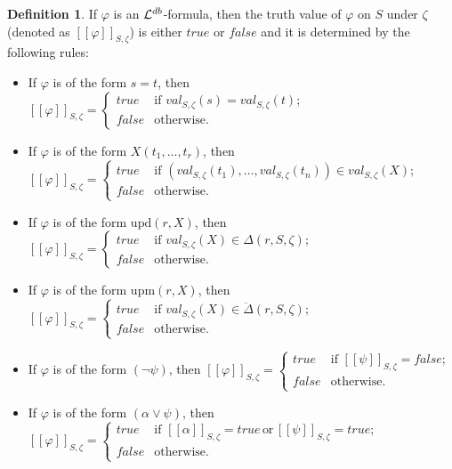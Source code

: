 \documentclass[preprint,11pt]{elsarticle}
\theoremstyle{definition}
\newtheorem{definition}{Definition}[section]
\theoremstyle{remark}
\begin{document}
\begin{definition}
If $\varphi$ is an ${\cal L}^{db}$-formula, then the truth value of $\varphi$ on $S$ under $\zeta$ (denoted as $[\![\varphi]\!]_{S,\zeta}$) is either $\mathit{true}$ or $\mathit{false}$ and it is determined by the following rules:
\begin{itemize}
\item If $\varphi$ is of the form $s=t$, then $[\![\varphi]\!]_{S,\zeta} = \begin{cases} \mathit{true} &\text{if } val_{S,\zeta}(s)=val_{S,\zeta}(t);\\ \textit{false} & \text{otherwise.}\end{cases}$
\item If $\varphi$ is of the form $X(t_1, \ldots, t_r)$, then \\\hspace*{3.5cm}$[\![\varphi]\!]_{S,\zeta} = \begin{cases} \mathit{true} &\text{if } (val_{S,\zeta}(t_1), \ldots, val_{S,\zeta}(t_n)) \in val_{S, \zeta}(X);\\ \textit{false} & \text{otherwise.} \end{cases}$
\item If $\varphi$ is of the form $\textrm{upd}(r,X)$, then $[\![\varphi]\!]_{S,\zeta} = \begin{cases} \mathit{true} &\text{if } val_{S,\zeta}(X) \in \Delta(r,S,\zeta);\\ \textit{false} & \text{otherwise.} \end{cases}$
\item If $\varphi$ is of the form $\textrm{upm}(r, X)$, then $[\![\varphi]\!]_{S,\zeta} = \begin{cases} \mathit{true} &\text{if } val_{S,\zeta}(X) \in \ddot{\Delta}(r,S,\zeta);\\ \textit{false} & \text{otherwise.} \end{cases}$
\item If $\varphi$ is of the form $(\neg \psi)$, then $[\![\varphi]\!]_{S,\zeta} = \begin{cases} \mathit{true} &\text{if } [\![\psi]\!]_{S,\zeta}=\mathit{false};\\ \textit{false} & \text{otherwise.}\end{cases}$
\item If $\varphi$ is of the form $(\alpha \vee \psi)$, then $[\![\varphi]\!]_{S,\zeta} = \begin{cases} \mathit{true} &\text{if } [\![\alpha]\!]_{S,\zeta}=\mathit{true} \, \text{or} \, [\![\psi]\!]_{S,\zeta}=\mathit{true};\\ \textit{false} & \text{otherwise.}\end{cases}$

\end{itemize}
\end{definition}
\end{document}
